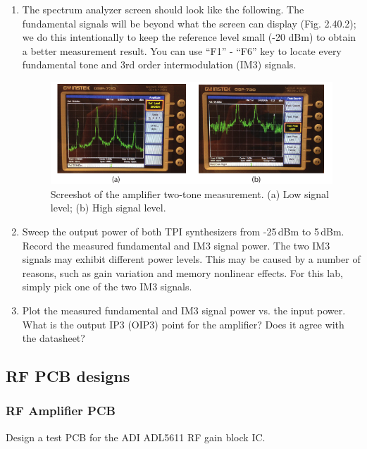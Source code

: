 \documentclass[letterpaper, 11pt]{article}
\begin{document}
\begin{enumerate}
	\item The spectrum analyzer screen should look like the following. The fundamental signals will be beyond what the screen can display (Fig. 2.40.2); we do this intentionally to keep the reference level small (-20 dBm) to obtain a better measurement result. You can use ``F1'' - ``F6'' key to locate every fundamental tone and 3rd order intermodulation (IM3) signals. 
		\begin{figure}[h]
			\centering
			\includegraphics[width=4.5in]{sa-two-tone-amp}
			\caption{Screeshot of the amplifier two-tone measurement. (a) Low signal level; (b) High signal level.}
			\label{fig:sa-two-tone-amp}
		\end{figure}
	\item Sweep the output power of both TPI synthesizers from -25\,dBm to 5\,dBm. Record the measured fundamental and IM3 signal power. The two IM3 signals may exhibit different power levels. This may be caused by a number of reasons, such as gain variation and memory nonlinear effects. For this lab, simply pick one of the two IM3 signals.
	
	\item Plot the measured fundamental and IM3 signal power vs. the input power. What is the output IP3 (OIP3) point for the amplifier? Does it agree with the datasheet?

\end{enumerate}


\subsection{RF PCB designs}

\subsubsection{RF Amplifier PCB}
Design a test PCB for the ADI ADL5611 RF gain block IC. 
\end{document}
